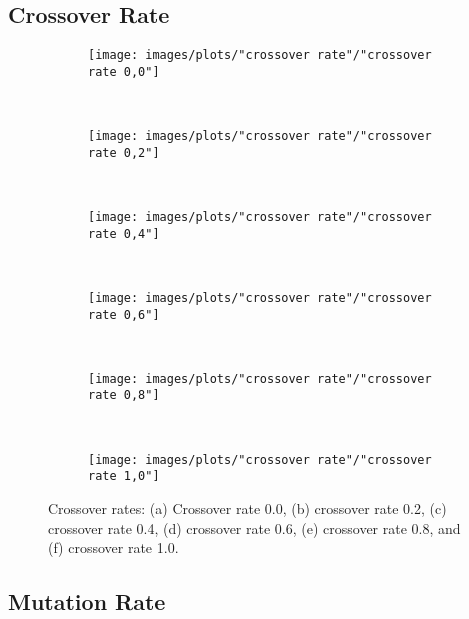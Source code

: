 \subsection{Crossover Rate}


\begin{figure}[h!]
    \centering
    \begin{subfigure}[b]{0.31\textwidth}
        \texttt{[image: images/plots/"crossover rate"/"crossover rate 0,0"]}
        \caption{}
        \hfill
        \label{plot:crossover rate 0.0}
    \end{subfigure}
    ~
    \begin{subfigure}[b]{0.31\textwidth}
        \texttt{[image: images/plots/"crossover rate"/"crossover rate 0,2"]}
        \caption{}
        \hfill
        \label{plot:two point crossover}
    \end{subfigure}
    ~
       \begin{subfigure}[b]{0.31\textwidth}
        \texttt{[image: images/plots/"crossover rate"/"crossover rate 0,4"]}
        \caption{}
        \hfill
        \label{plot:two point crossover}
    \end{subfigure}
    ~
       \begin{subfigure}[b]{0.31\textwidth}
        \texttt{[image: images/plots/"crossover rate"/"crossover rate 0,6"]}
        \caption{}
        \hfill
        \label{plot:two point crossover}
    \end{subfigure}
    ~
       \begin{subfigure}[b]{0.31\textwidth}
        \texttt{[image: images/plots/"crossover rate"/"crossover rate 0,8"]}
        \caption{}
        \hfill
        \label{plot:two point crossover}
    \end{subfigure}
    ~
    \begin{subfigure}[b]{0.31\textwidth}
        \texttt{[image: images/plots/"crossover rate"/"crossover rate 1,0"]}
        \caption{}
        \hfill
        \label{plot:uniform crossover}
    \end{subfigure}
    \caption{Crossover rates: (a) Crossover rate 0.0, (b) crossover rate 0.2, (c) crossover rate 0.4, (d) crossover rate 0.6, (e) crossover rate 0.8, and (f) crossover rate 1.0.}
    \label{plot:crossover methods}
\end{figure}


\subsection{Mutation Rate}


